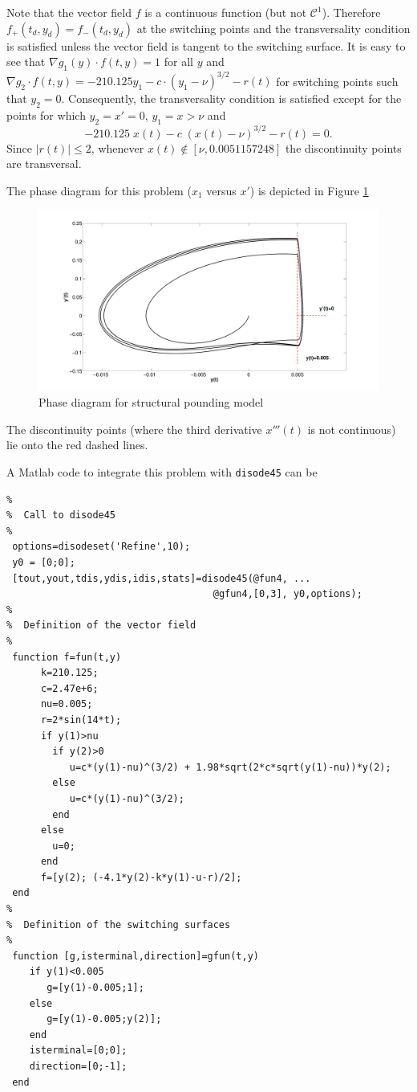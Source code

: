 \documentclass{article}
\begin{document}
\begin{description}
Note that the vector field $f$ is a
continuous function (but not $\mathcal{C}^1$).
Therefore $f_{+}(t_d,y_d)=f_{-}(t_d,y_d)$ at the switching points and the
trans\-versality condition is satisfied unless the vector field
is tangent to the switching surface.
It is easy to see that
$\nabla g_1(y) \cdot f(t, y)= 1$
for all $y$ and
$\nabla g_2 \cdot f(t, y) = -210.125 y_1 - c\cdot(y_1-\nu)^{3/2} - r(t)$
for switching points such that $y_2=0$.
Consequently, the transversality condition is satisfied except for the points
for which $y_2=x'=0$, $y_1=x >\nu$ and
\[
-210.125\; x(t) - c\;(x(t)-\nu)^{3/2} - r(t)=0.
\]
Since $|r(t)| \le 2$, whenever $x(t)\not\in [\nu, 0.0051157248]$
the discontinuity points are transversal.

The phase diagram for this problem ($x_1$ versus $x'$) is depicted in Figure \ref{Example4}
\begin{figure}[!h]
\centerline{
\includegraphics[width=15 true cm]{earthquake-phase}
}
\caption{Phase diagram for structural pounding model}
\label{Example4}
\end{figure}

The discontinuity points (where the third derivative $x'''(t)$ is not continuous)
lie onto the red dashed lines.


A Matlab code to integrate this problem with \texttt{disode45} can be

\bigskip

\begin{verbatim}
%
%  Call to disode45
%
 options=disodeset('Refine',10);
 y0 = [0;0];
 [tout,yout,tdis,ydis,idis,stats]=disode45(@fun4, ...
                                    @gfun4,[0,3], y0,options);
%
%  Definition of the vector field
%
 function f=fun(t,y)
      k=210.125;
      c=2.47e+6;
      nu=0.005;
      r=2*sin(14*t);
      if y(1)>nu
        if y(2)>0
           u=c*(y(1)-nu)^(3/2) + 1.98*sqrt(2*c*sqrt(y(1)-nu))*y(2);
        else
           u=c*(y(1)-nu)^(3/2);
        end
      else
        u=0;
      end
      f=[y(2); (-4.1*y(2)-k*y(1)-u-r)/2];
 end
%
%  Definition of the switching surfaces
%
 function [g,isterminal,direction]=gfun(t,y)
    if y(1)<0.005
       g=[y(1)-0.005;1];
    else
       g=[y(1)-0.005;y(2)];
    end
    isterminal=[0;0];
    direction=[0;-1];
 end
\end{verbatim}


\end{description}
\end{document}
